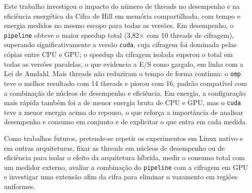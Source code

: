 \documentclass[12pt]{article}
\begin{document}
Este trabalho investigou o impacto do número de threads no desempenho e na
eficiência energética da Cifra de Hill em memória compartilhada, com tempo e
energia medidos no mesmo escopo para todas as versões. Em desempenho, o
\texttt{pipeline} obteve o maior speedup total (3,82$\times$ com 10 threads de
cifragem), superando significativamente a versão \texttt{cuda}, cuja cifragem
foi dominada pelas cópias entre CPU e GPU; o speedup da cifragem isolada
superou o total em todas as versões paralelas, o que evidencia a E/S como
gargalo, em linha com a Lei de Amdahl. Mais threads não reduziram o tempo de
forma contínua: o \texttt{omp} teve o melhor resultado com 14 threads e piorou
com 16, padrão compatível com a combinação de núcleos de desempenho e
eficiência. Em energia, a configuração mais rápida também foi a de menor energia
bruta de CPU e GPU, mas o \texttt{cuda} teve a menor energia acima do repouso,
o que reforça a importância de analisar desempenho e consumo em conjunto e de
explicitar o que entra em cada medida.

Como trabalhos futuros, pretende-se repetir os experimentos em Linux nativo e em
outras arquiteturas, fixar as threads em núcleos de desempenho ou de eficiência
para isolar o efeito da arquitetura híbrida, medir o consumo total com um
medidor externo, avaliar a combinação do \texttt{pipeline} com a cifragem em GPU
e investigar uma extensão afim da cifra para eliminar o vazamento em regiões
uniformes.




\end{document}
